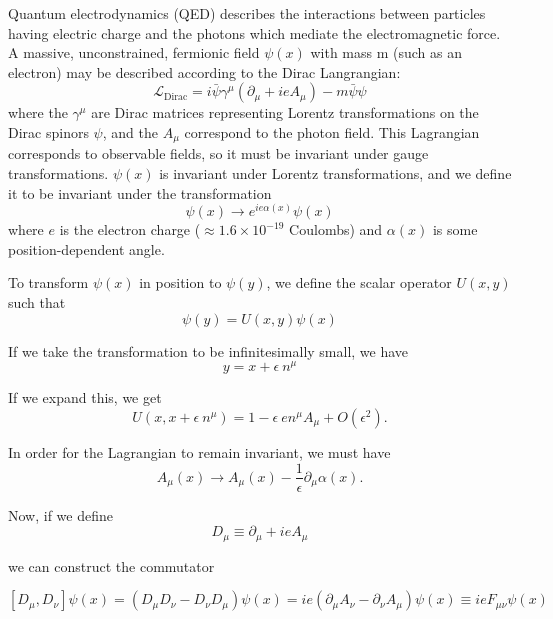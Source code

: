 Quantum electrodynamics (QED) describes the interactions between particles having electric charge and the photons which mediate the electromagnetic force. A massive, unconstrained, fermionic field $\psi(x)$ with mass m (such as an electron) may be described according to the Dirac Langrangian:
\begin{equation}
\mathcal{L}_{\text{Dirac}} = i\bar{\psi}\gamma^{\mu}\left(\partial_{\mu} + ieA_{\mu}\right) - m\bar{\psi}\psi
\end{equation}
where the $\gamma^{\mu}$ are Dirac matrices representing Lorentz transformations on the Dirac spinors $\psi$, and the $A_{\mu}$ correspond to the photon field. This Lagrangian corresponds to observable fields, so it must be invariant under gauge transformations. $\psi(x)$ is invariant under Lorentz transformations, and we define it to be invariant under the transformation
\begin{equation}
\psi(x) \to e^{ie\alpha(x)}\psi(x)
\end{equation}
where $e$ is the electron charge ($\approx 1.6 \times 10^{-19}$ Coulombs) and $\alpha(x)$ is some position-dependent angle.

To transform $\psi(x)$ in position to $\psi(y)$, we define the scalar operator $U(x, y)$ such that
\begin{equation}
\psi(y) = U(x, y)\psi(x)
\end{equation}

If we take the transformation to be infinitesimally small, we have
\begin{equation}
y = x + \epsilon\ n^{\mu}
\end{equation}

If we expand this, we get
\begin{equation}
U(x, x + \epsilon\ n^{\mu}) = 1 - \epsilon\ en^{\mu}A_{\mu} + O(\epsilon^{2}).
\end{equation}

In order for the Lagrangian to remain invariant, we must have
\begin{equation}
A_{\mu}(x) \to A_{\mu}(x) - \frac{1}{\epsilon}\partial_{\mu}\alpha(x).
\end{equation}

Now, if we define
\begin{equation}
D_{\mu} \equiv \partial_{\mu} + ieA_{\mu}
\end{equation}

we can construct the commutator

\begin{equation}
\left[D_{\mu}, D_{\nu}\right]\psi(x) = \left(D_{\mu}D_{\nu} - D_{\nu}D_{\mu}\right)\psi(x)
= ie\left(\partial_{\mu}A_{\nu} - \partial_{\nu}A_{\mu}\right)\psi(x) \equiv ieF_{\mu\nu}\psi(x)
\end{equation}

